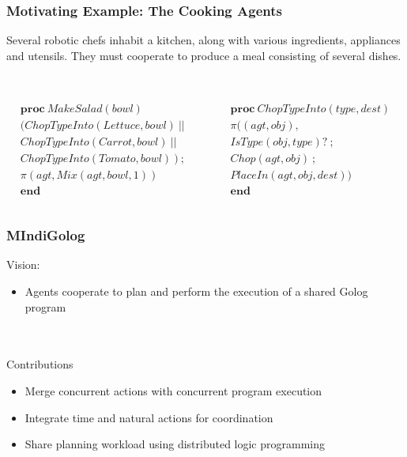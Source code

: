 \documentclass{beamer}
\begin{document}
\begin{frame}
\frametitle{Motivating Example: The Cooking Agents}
Several robotic chefs inhabit a kitchen, along with various ingredients,
appliances and utensils.  They must cooperate to produce a meal consisting
of several dishes.\\
\ \\
\pause
\begin{columns}
  \begin{column}{0.5\textwidth}
\[
\begin{array}{c}
\mathbf{proc}\ MakeSalad(bowl)\\
(ChopTypeInto(Lettuce,bowl)\ ||\\
ChopTypeInto(Carrot,bowl)\ ||\\
ChopTypeInto(Tomato,bowl)\ )\ ;\\
\pi(agt, Mix(agt,bowl,1))\\
\mathbf{end}\end{array}\]
  \end{column}
  \begin{column}{0.5\textwidth}
\[
\begin{array}{c}
\mathbf{proc}\ ChopTypeInto(type,dest)\\
\pi((agt,obj), \ \ \ \ \ \ \ \\
IsType(obj,type)?\ ;\\
Chop(agt,obj)\ ;\\
PlaceIn(agt,obj,dest))\\
\mathbf{end}\end{array}\]
  \end{column}
\end{columns}
\end{frame}

\begin{frame}
\frametitle{MIndiGolog}
Vision:
\begin{itemize}
\item Agents cooperate to plan and perform the execution of a shared Golog program
\end{itemize}
\ \\
\ \\
Contributions
\begin{itemize}
\item Merge concurrent actions with concurrent program execution
\item Integrate time and natural actions for coordination
\item Share planning workload using distributed logic programming
\end{itemize}
\end{frame}
\end{document}
